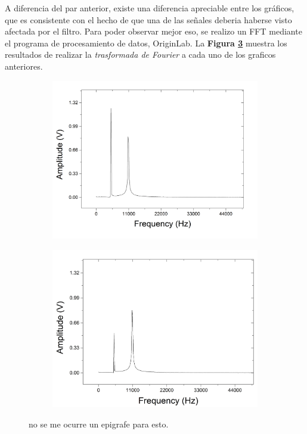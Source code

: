 \documentclass[11pt,a4paper]{article}
\begin{document}
A diferencia del par anterior, existe una diferencia apreciable entre los gráficos, que es consistente con el hecho de que una de las señales deberia haberse visto afectada por el filtro. Para poder observar mejor eso, se realizo un FFT mediante el programa de procesamiento de datos, OriginLab. La \textbf{Figura \ref{fig:FFT}} muestra los resultados de realizar la \textit{trasformada de Fourier} a cada uno de los graficos anteriores.

\begin{figure}[H]
	\begin{subfigure}{0.5\textwidth}
		\includegraphics[scale=0.3]{FFT_5005hz}
		\label{subfig:FFT_NFilt}
	\end{subfigure}
	\begin{subfigure}{0.5\textwidth}
		\includegraphics[scale=0.3]{FFT_5005hz_Filtrado}
		\label{subfig:FFT_Filt}
	\end{subfigure}
	\caption{no se me ocurre un epigrafe para esto.}
	\label{fig:FFT}
\end{figure}
\end{document}
